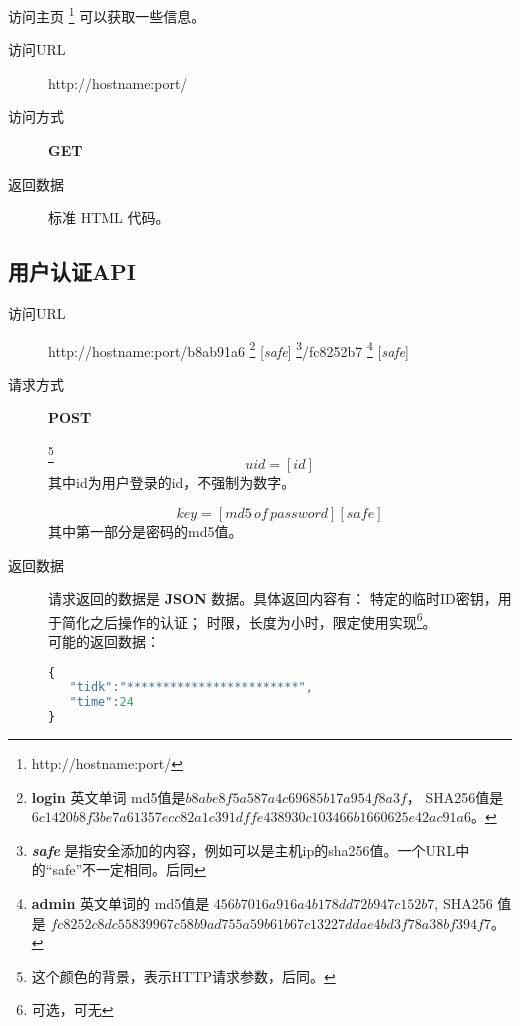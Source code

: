 \documentclass[UTF8]{ctexart}
\begin{document}
    访问主页
    \footnote{http://hostname:port/}
    可以获取一些信息。
    \begin{description}
        \item[访问URL] http://hostname:port/
        \item[访问方式] \textbf{GET}
        \item[返回数据] 标准 HTML 代码。
    \end{description}
    
    
    
    
    
    
    
    
    
    
    \subsection{用户认证API}
    
    
    
    
    
    
    
    
    
    
    
    \begin{description}
   
        \item[访问URL] http://hostname:port/b8ab91a6
        \footnote{
            \textbf{login} 英文单词 md5值是$b8abe8f5a587a4c69685b17a954f8a3f$，
            SHA256值是 
            $6c1420b8f3be7a61357ecc82a1c391dffe438930c103466b1660625e42ac91a6$。
        }
        [\textit{safe}]
        \footnote{\textit{\textbf{safe}} 是指安全添加的内容，例如可以是主机ip的sha256值。一个URL中的“safe”不一定相同。后同}/fc8252b7
        \footnote{
            \textbf{admin} 英文单词的
            md5值是 $456b7016a916a4b178dd72b947c152b7 $,
            SHA256 值是
            $fc8252c8dc55839967c58b9ad755a59b61b67c13227ddae4bd3f78a38bf394f7$。
        }
        [\textit{safe}]
        
        \item[请求方式] \textbf{POST}
        
        \label{par:id}
        \footnote{这个颜色的背景，表示HTTP请求参数，后同。}
        $$uid=[id]$$
        其中id为用户登录的id，不强制为数字。
        
        \label{par:key}
         $$key=[md5\, of\, password][safe]$$
         其中第一部分是密码的md5值。
         
        \item[返回数据]请求返回的数据是 \textbf{JSON} 数据。具体返回内容有：
        特定的临时ID密钥，用于简化之后操作的认证；
        时限，长度为小时，限定使用实现\footnote{可选，可无}。
         \\ 可能的返回数据：
        \begin{lstlisting}[language=JavaScript]
{
   "tidk":"************************",
   "time":24
}  
        \end{lstlisting}
        
        
    \end{description}
    
\end{document}
